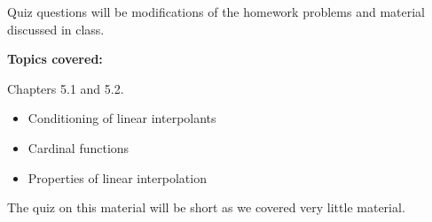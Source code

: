 \documentclass[reqno, answers]{exam}
\begin{document}
Quiz questions will be modifications of the homework problems and material discussed in class.

\textbf{Topics covered:}

Chapters 5.1 and 5.2.

\begin{itemize}
    \item Conditioning of linear interpolants
    \item Cardinal functions
    \item Properties of linear interpolation
\end{itemize}

The quiz on this material will be short as we covered very little material.
\end{document}
